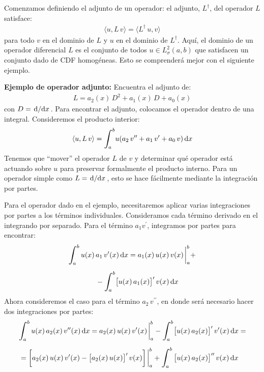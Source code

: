 \documentclass[12pt]{article}
\newcommand{\pderivada}[1]{\ensuremath{{#1}^{\prime}}}
\newcommand{\sderivada}[1]{\ensuremath{{#1}^{\prime \prime}}}
\def\scaleint#1{\vcenter{\hbox{\scaleto[3ex]{\displaystyle\int}{#1}}}}
\def\bs{\mkern-12mu}
\numberwithin{equation}{section}
\begin{document}
Comenzamos definiendo el adjunto de un operador:  el adjunto, $L^{\dagger}$, del operador $L$ satisface:
\begin{align*}
\langle u, L \, v \rangle = \langle L^{\dagger} \, u,  v \rangle
\end{align*}
para todo $v$ en el dominio de $L$ y $u$ en el dominio de $L^{\dagger}$. Aquí, el dominio de un operador diferencial $L$ es el conjunto de todos $u \in L_{\sigma}^{2} (a, b)$ que satisfacen un conjunto dado de CDF homogéneas. Esto se comprenderá mejor con el siguiente ejemplo.
\par
\noindent
\textbf{Ejemplo de operador adjunto: } Encuentra el adjunto de:
\begin{align*}
L = a_{2}(x) \, D^{2} + a_{1}(x) \, D + a_{0}(x)
\end{align*}
con $D = \dv*{x}$.
Para encontrar el adjunto, colocamos el operador dentro de una integral. Consideremos el producto interior:
\begin{align*}
\langle u , L \, v \rangle = \scaleint{6ex}_{\bs a}^{b} u (a_{2} \, \sderivada{v} + a_{1} \, \pderivada{v} + a_{0} \, v) \dd{x}
\end{align*}
Tenemos que \enquote{mover} el operador $L$ de $v$  y determinar qué operador está actuando sobre $u$ para preservar formalmente el producto interno. Para un operador simple como $L = \dv*{x}$, esto se hace fácilmente mediante la integración por partes.
\par
Para el operador dado en el ejemplo, necesitaremos aplicar varias integraciones por partes a los términos individuales. Consideramos cada término derivado en el integrando por separado. Para el término $a_{1} \pderivada{v}$, integramos por partes para encontrar:
\begin{eqnarray}
\begin{aligned}[b]
\scaleint{6ex}_{\bs a}^{b} \, u(x) \, &a_{1} \, \pderivada{v}(x) \dd{x} = a_{1}(x) \, u(x) \, v(x) \eval_{a}^{b} + \\[0.5em]
&- \scaleint{6ex}_{\bs a}^{b} \big[ u(x) \, a_{1} (x) \big]^{\prime} \, v(x) \dd{x}
\end{aligned}
\label{eq:ecuacion_04_17}
\end{eqnarray}
Ahora consideremos el caso para el término $a_{2} \, \sderivada{v}$, en donde será necesario hacer dos integraciones por partes:
\begin{eqnarray}
\begin{aligned}[b]
&\scaleint{6ex}_{\bs a}^{b} \, u(x) \, a_{2} (x) \, \sderivada{v}(x) \dd{x} = a_{2}(x) \, u(x) \, \pderivada{v}(x) \eval_{a}^{b} - \scaleint{6ex}_{\bs a}^{b} \big[ u(x) \, a_{2} (x) \big]^{\prime} \, \pderivada{v}(x) \dd{x} = \\[0.5em]
&= \bigg[ a_{2}(x) \, u(x) \, \pderivada{v}(x) - \big[ a_{2}(x) \, u(x) \big]^{\prime} \, v(x) \bigg] \eval_{a}^{b} + \scaleint{6ex}_{\bs a}^{b} \, \big[ u(x) \, a_{2} (x) \big]^{\prime \prime} \, v(x) \dd{x}
\end{aligned}
\label{eq:ecuacion_04_18}
\end{eqnarray}
\end{document}
